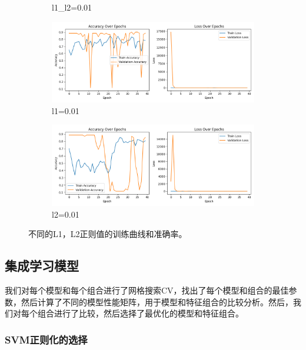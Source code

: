 \documentclass[a4paper, 10pt]{article}
\begin{document}
\begin{figure}[htbp]
\begin{subfigure}{0.5\textwidth}
			\caption{l1\_l2=0.01}
			\label{fig: reg3}
		\end{subfigure}	
		\begin{subfigure}{0.5\textwidth}
			\includegraphics[width=\linewidth]{picture/sz640_training_validation_curves_regl1=0.01}
			\caption{l1=0.01}
			\label{fig: reg4}
		\end{subfigure}	
		\begin{subfigure}{0.5\textwidth}
			\includegraphics[width=\linewidth]{picture/sz640_training_validation_curves_regl2=0.01}
			\caption{l2=0.01}
			\label{fig: reg5}
		\end{subfigure}	
		
		\caption{
			\label{fig: regular}
			不同的L1，L2正则值的训练曲线和准确率。
		}
	\end{figure}
	
	\subsection{集成学习模型}
	
	我们对每个模型和每个组合进行了网格搜索CV，找出了每个模型和组合的最佳参数，然后计算了不同的模型性能矩阵，用于模型和特征组合的比较分析。然后，我们对每个组合进行了比较，然后选择了最优化的模型和特征组合。
	
	\subsubsection{SVM正则化的选择}
	
\end{document}
